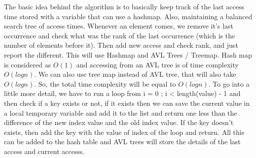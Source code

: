 \documentclass[12pt,twoside]{article}
\begin{document}
\begin{problems}
\newpage
\problem  %
The basic idea behind the algorithm is to basically keep track of the last access time stored with a variable that can use a hashmap. Also, maintaining a balanced search tree of access times. Whenever an element comes, we remove it's last occurrence and check what was the rank of the last occurrence (which is the number of elements before it). Then add new access and check rank, and just report the different. This will use Hashmap and AVL Trees / Treemap. Hash map is considered as $O(1)$ and accessing from an AVL tree is of time complexity $O(logn)$. We can also use tree map instead of AVL tree, that will also take $O(logn)$. So, the total time complexity will be equal to $O(logn)$.
To go into a little more detail, we have to run a loop from i = 0 ; i < length(value) - 1 and then check if a key exists or not, if it exists then we can save the current value in a local temporary variable and add it to the list and return one less than the difference of the new index value and the old index value. If the key doesn't exists, then add the key with the value of index of the loop and return. All this can be added to the hash table and AVL trees will store the details of the last access and current accesss.




\end{problems}
\end{document}
